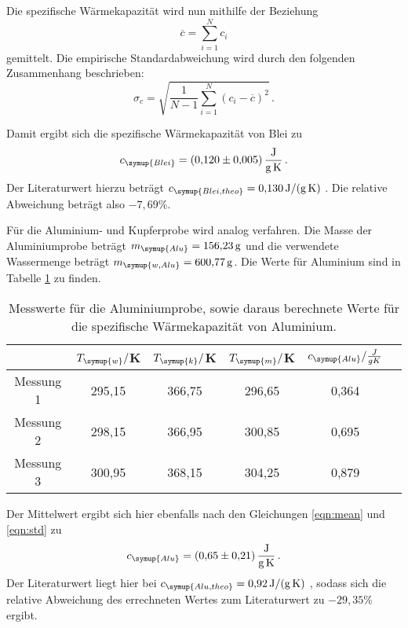 Die spezifische Wärmekapazität wird nun mithilfe der Beziehung
\begin{equation}
  \overline{c} = \sum\limits_{i = 1}^N c_i
  \label{eqn:mean}
\end{equation}
gemittelt. Die empirische Standardabweichung wird durch den folgenden Zusammenhang
beschrieben:
\begin{equation}
  \sigma_c = \sqrt{\frac{1}{N-1}
    \sum\limits_{i = 1}^N
    (c_i-\overline{c})^2} \,.
    \label{eqn:std}
\end{equation}

Damit ergibt sich die spezifische Wärmekapazität von Blei zu
\begin{equation}
  c_{\symup{Blei}} = \SI{0.120(0005)}{\joule\per\gram\per\kelvin} \,.\nonumber
\end{equation}
Der Literaturwert hierzu beträgt $c_{\symup{Blei,theo}}=\SI{0.130}{\joule\per\gram\per\kelvin}$ \cite{werte}.
Die relative Abweichung beträgt also $-7,69\%$.

Für die Aluminium- und Kupferprobe wird analog verfahren. Die Masse der Aluminiumprobe
beträgt $m_{\symup{Alu}}=\SI{156.23}{\gram}$ und die verwendete Wassermenge
beträgt $m_{\symup{w,Alu}}=\SI{600.77}{\gram}$. Die Werte für Aluminium sind in
Tabelle \ref{tab:alu} zu finden.

\begin{table}
  \centering
  \caption{Messwerte für die Aluminiumprobe, sowie daraus berechnete Werte für die spezifische
  Wärmekapazität von Aluminium.}
  \label{tab:alu}
  \begin{tabular}{c c c c c c}
    \toprule
    & $T_{\symup{w}}/$K & $T_{\symup{k}}/$K & $T_{\symup{m}}/$K & $c_{\symup{Alu}}/\frac{J}{g K}$ \\
    \midrule
    Messung 1 & 295,15 & 366,75 & 296,65 & 0,364 \\
    Messung 2 & 298,15 & 366,95 & 300,85 & 0,695 \\
    Messung 3 & 300,95 & 368,15 & 304,25 & 0,879 \\
    \bottomrule
  \end{tabular}
\end{table}

Der Mittelwert ergibt sich hier ebenfalls nach den Gleichungen \eqref{eqn:mean} und
\eqref{eqn:std} zu
\begin{equation}
  c_{\symup{Alu}} = \SI{0.65(021)}{\joule\per\gram\per\kelvin} \,.\nonumber
\end{equation}
Der Literaturwert liegt hier bei $c_{\symup{Alu,theo}}=\SI{0.92}{\joule\per\gram\per\kelvin}$ \cite{werte},
sodass sich die relative Abweichung des errechneten Wertes zum Literaturwert zu
$-29,35\%$ ergibt.


